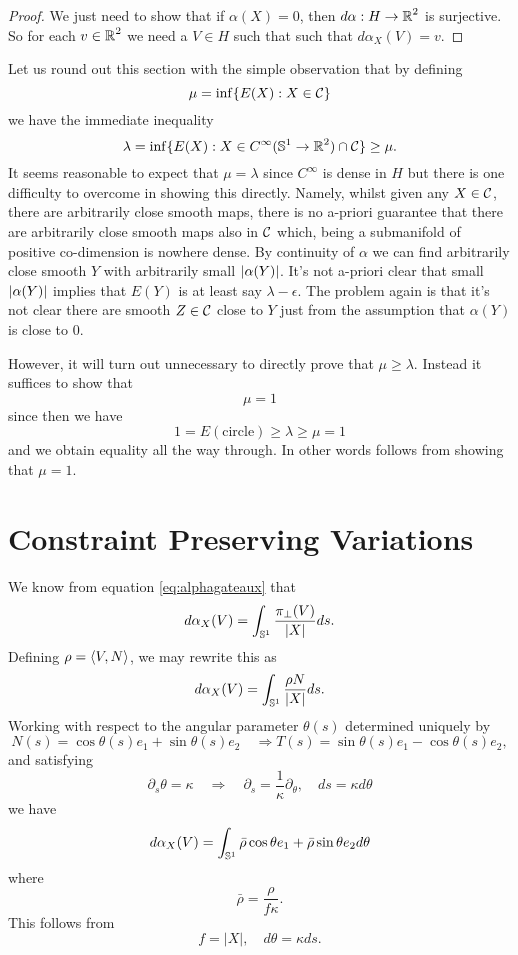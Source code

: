 \documentclass[12pt]{article}
\begin{document}
\begin{proof}
We just need to show that if \(\alpha(X) = 0\), then \(d\alpha : H \to \operatorname{\mathbb{R}}^2\) is surjective. So for each \(v \in \operatorname{\mathbb{R}}^2\) we need a \(V \in H\) such that such that \(d\alpha_X (V) = v\).
\end{proof}

Let us round out this section with the simple observation that by defining
\begin{equation}
\label{eq:mu}
\mu = \inf\{E(X) : X \in \operatorname{\mathcal{C}}\}
\end{equation}
we have the immediate inequality
\[
\lambda = \inf\{E(X) : X \in C^{\infty}(\operatorname{\mathbb{S}^1} \to \operatorname{\mathbb{R}}^2) \cap \operatorname{\mathcal{C}}\} \geq \mu.
\]
It seems reasonable to expect that \(\mu = \lambda\) since \(C^{\infty}\) is dense in \(H\) but there is one difficulty to overcome in showing this directly. Namely, whilst given any \(X \in \operatorname{\mathcal{C}}\), there are arbitrarily close smooth maps, there is no a-priori guarantee that there are arbitrarily close smooth maps also in \(\operatorname{\mathcal{C}}\) which, being a submanifold of positive co-dimension is nowhere dense. By continuity of \(\alpha\) we can find arbitrarily close smooth \(Y\) with arbitrarily small \(\left|{\alpha(Y)}\right|\). It's not a-priori clear that small \(\left|{\alpha(Y)}\right|\) implies that \(E(Y)\) is at least say \(\lambda - \epsilon\). The problem again is that it's not clear there are smooth \(Z \in \operatorname{\mathcal{C}}\) close to \(Y\) just from the assumption that \(\alpha(Y)\) is close to \(0\).

However, it will turn out unnecessary to directly prove that \(\mu \geq \lambda\). Instead it suffices to show that
\[
\mu = 1
\]
since then we have
\[
1 = E(\text{circle}) \geq \lambda \geq \mu = 1
\]
and we obtain equality all the way through. In other words  follows from showing that \(\mu = 1\).

\section{Constraint Preserving Variations}

We know from equation \eqref{eq:alphagateaux} that
\[
d\alpha_X (V) = \int_{\operatorname{\mathbb{S}^1}} \frac{\pi_{\perp} (V)}{|X|} ds.
\]
Defining \(\rho = \left\langle{V},{N}\right\rangle\), we may rewrite this as
\[
d\alpha_X (V) = \int_{\operatorname{\mathbb{S}^1}} \frac{\rho N}{|X|} ds.
\]
Working with respect to the angular parameter \(\theta(s)\) determined uniquely by
\[
N(s) = \cos \theta(s) e_1 + \sin \theta(s) e_2 \quad \Rightarrow T(s) = \sin \theta(s) e_1 - \cos \theta(s) e_2,
\]
and satisfying
\[
\partial_s \theta = \kappa \quad \Rightarrow \quad \partial_s = \frac{1}{\kappa} \partial_{\theta}, \quad ds = \kappa d\theta
\]
we have
\[
d\alpha_X (V) = \int_{\operatorname{\mathbb{S}^1}} \bar{\rho} \cos\theta e_1 + \bar{\rho} \sin\theta e_2 d\theta
\]
where
\[
\bar{\rho} = \frac{\rho}{f \kappa}.
\]
This follows from
\[
f = |X|, \quad d\theta = \kappa ds.
\]
\end{document}
